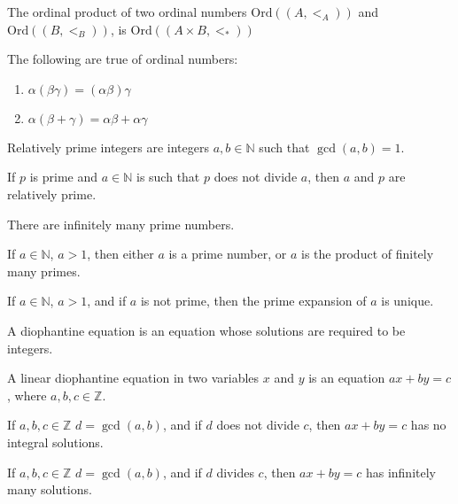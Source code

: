         \begin{definition}
           The ordinal product of two ordinal numbers
           $\mathrm{Ord}((A,<_{A}))$ and $\mathrm{Ord}((B,<_{B}))$,
           is $\mathrm{Ord}(({A}\times{B},<_{*}))$
        \end{definition}
        \begin{theorem}
           The following are true of ordinal numbers:
           \begin{enumerate}
                \item $\alpha(\beta\gamma)%
                       =(\alpha\beta)\gamma$
                \item $\alpha(\beta+\gamma)%
                       =\alpha\beta+\alpha\gamma$
           \end{enumerate}
        \end{theorem}
        \begin{definition}
           Relatively prime integers are integers
           $a,b\in\mathbb{N}$ such that $\gcd(a,b)=1$.
        \end{definition}
        \begin{theorem}
           If $p$ is prime and $a\in\mathbb{N}$ is
           such that $p$ does not divide $a$, then $a$ and $p$
           are relatively prime.
        \end{theorem}
        \begin{theorem}
           There are infinitely many prime numbers.
        \end{theorem}
        \begin{theorem}
           If $a\in\mathbb{N}$, $a>1$, then either
           $a$ is a prime number, or $a$ is the product
           of finitely many primes.
        \end{theorem}
        \begin{theorem}
           If $a\in\mathbb{N}$, $a>1$, and if $a$ is not
           prime, then the prime expansion of $a$ is
           unique.
        \end{theorem}
        \begin{definition}
           A diophantine equation is an equation whose
           solutions are required to be integers.
        \end{definition}
        \begin{definition}
           A linear diophantine equation in two variables
           $x$ and $y$ is an equation
           $ax+by=c$, where $a,b,c\in\mathbb{Z}$.
        \end{definition}
        \begin{theorem}
           If $a,b,c\in\mathbb{Z}$ $d=\gcd(a,b)$,
           and if $d$ does not divide $c$,
           then $ax+by=c$ has no integral solutions.
        \end{theorem}
        \begin{theorem}
           If $a,b,c\in\mathbb{Z}$ $d=\gcd(a,b)$,
           and if $d$ divides $c$,
           then $ax+by=c$ has infinitely many solutions.
        \end{theorem}
